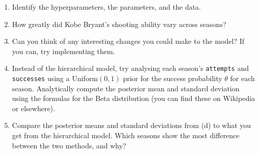 \documentclass[12pt]{article}
\begin{document}
\begin{Questions}
\begin{enumerate}
\item[(a)] Identify the hyperparameters, the parameters, and the data.
\item[(b)] How greatly did Kobe Bryant’s shooting ability vary across seasons?
\item[(c)] Can you think of any interesting changes you could make to the model? If you
can, try implementing them.
\item[(d)] Instead of the hierarchical model, try analysing each season's
\texttt{attempts} and \texttt{successes} using a Uniform$(0, 1)$
prior for the success probability $\theta$ for each season. Analytically
compute the posterior mean and standard deviation using the formulas
for the Beta distribution (you can find these on Wikipedia or elsewhere).
\item[(e)] Compare the posterior means and standard deviations from (d)
to what you get from the hierarchical model. Which seasons show the most
difference between the two methods, and why?
\end{enumerate}

\end{Questions}
\end{document}
